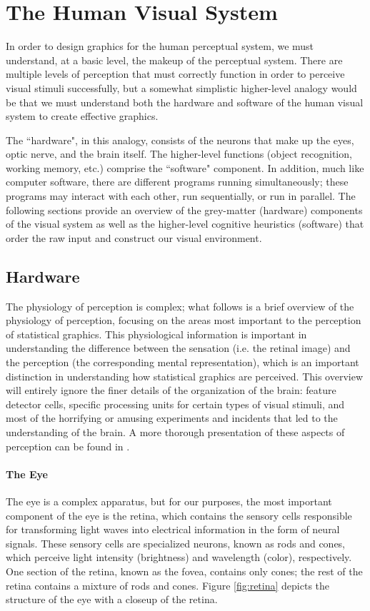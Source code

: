 \documentclass[11pt]{isuthesis}\usepackage[]{graphicx}\usepackage[]{color}
\begin{document}
\section{The Human Visual System}
In order to design graphics for the human perceptual system, we must understand, at a basic level, the makeup of the perceptual system. There are multiple levels of perception that must correctly function in order to perceive visual stimuli successfully, but a somewhat simplistic higher-level analogy would be that we must understand both the hardware and software of the human visual system to create effective graphics.

The ``hardware", in this analogy, consists of the neurons that make up the eyes, optic nerve, and the brain itself. The higher-level functions (object recognition, working memory, etc.) comprise the ``software" component. In addition, much like computer software, there are different programs running simultaneously; these programs may interact with each other, run sequentially, or run in parallel. The following sections provide an overview of the grey-matter (hardware) components of the visual system as well as the higher-level cognitive heuristics (software) that order the raw input and construct our visual environment. 

\subsection{Hardware}
The physiology of perception is complex; what follows is a brief overview of the physiology of perception, focusing on the areas most important to the perception of statistical graphics. This physiological information is important in understanding the difference between the sensation (i.e. the retinal image) and the perception (the corresponding mental representation), which is an important distinction in understanding how statistical graphics are perceived. This overview will entirely ignore the finer details of the organization of the brain: feature detector cells, specific processing units for certain types of visual stimuli, and most of the horrifying or amusing experiments and incidents that led to the understanding of the brain. A more thorough presentation of these aspects of perception can be found in \citet{goldstein}. 

\paragraph{The Eye}
The eye is a complex apparatus, but for our purposes, the most important component of the eye is the retina, which contains the sensory cells responsible for transforming light waves into electrical information in the form of neural signals. These sensory cells are specialized neurons, known as rods and cones, which perceive light intensity (brightness) and wavelength (color), respectively. One section of the retina, known as the fovea, contains only cones; the rest of the retina contains a mixture of rods and cones. Figure \ref{fig:retina} depicts the structure of the eye with a closeup of the retina. 
\end{document}
